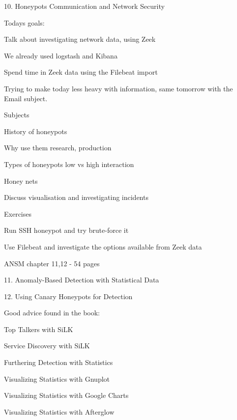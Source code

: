\documentclass[Screen16to9,17pt]{foils}
\begin{document}
\mytitlepage
{10. Honeypots}
{Communication and Network Security \the\year}




Todays goals:
\begin{list2}
\item Talk about investigating network data, using Zeek
\item We already used logstash and Kibana
\item Spend time in Zeek data using the Filebeat import
\end{list2}

Trying to make today less heavy with information, same tomorrow with the Email subject.




\begin{list1}
\item Subjects
\begin{list2}
\item History of honeypots
\item Why use them research, production
\item Types of honeypots low vs high interaction
\item Honey nets
\item Discuss visualisation and investigating incidents
\end{list2}
\item Exercises
\begin{list2}
\item Run SSH honeypot and try brute-force it
\item Use Filebeat and investigate the options available from Zeek data
\end{list2}
\end{list1}



\begin{list1}
\item ANSM chapter 11,12 - 54 pages
\item 11. Anomaly-Based Detection
with Statistical Data
\item 12. Using Canary Honeypots
for Detection
\end{list1}



Good advice found in the book:
\begin{list2}
\item Top Talkers with SiLK
\item Service Discovery with SiLK
\item Furthering Detection with Statistics
\item Visualizing Statistics with Gnuplot
\item Visualizing Statistics with Google Charts
\item Visualizing Statistics with Afterglow
\end{list2}
\end{document}
